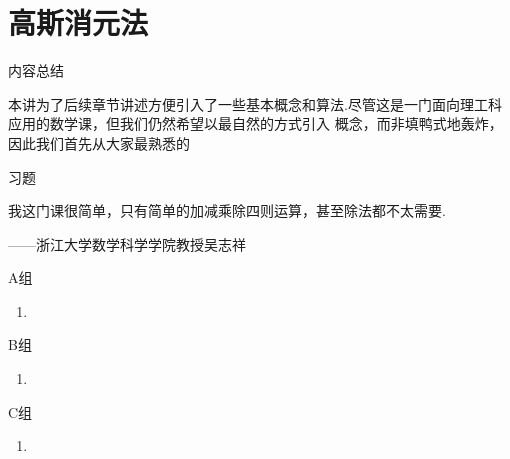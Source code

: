 \section{高斯消元法}


\vspace{2ex} 
\centerline{\heiti \Large 内容总结}
\vspace{2ex} 

本讲为了后续章节讲述方便引入了一些基本概念和算法.尽管这是一门面向理工科应用的数学课，但我们仍然希望以最自然的方式引入
概念，而非填鸭式地轰炸，因此我们首先从大家最熟悉的

\centerline{\heiti \Large 习题}
\vspace{2ex} 
{\kaishu 我这门课很简单，只有简单的加减乘除四则运算，甚至除法都不太需要.}
\begin{flushright}
    \kaishu
	——浙江大学数学科学学院教授吴志祥
\end{flushright}
\centerline{\heiti A组}
\begin{enumerate}
	\item 
\end{enumerate}
\centerline{\heiti B组}
\begin{enumerate}
	\item 
\end{enumerate}
\centerline{\heiti C组}
\begin{enumerate}
	\item 
\end{enumerate}